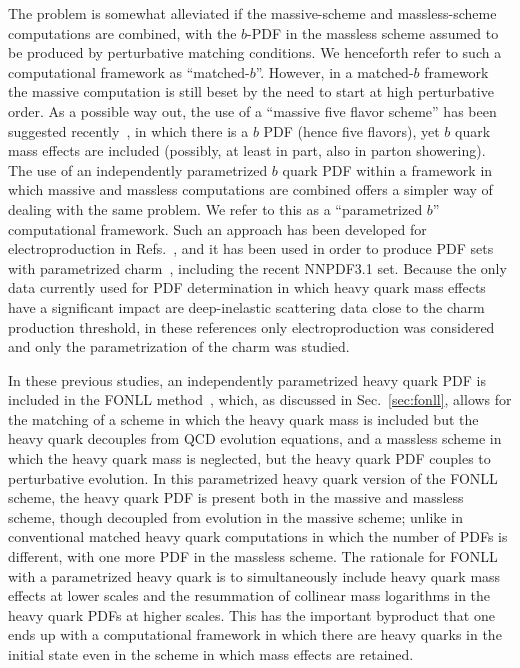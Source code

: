 The problem is somewhat
alleviated if the massive-scheme and massless-scheme
computations are combined, with the $b$-PDF in the massless scheme assumed to be
produced by perturbative matching conditions.  We  henceforth refer to
such a computational 
framework as ``matched-$b$''. However, in a matched-$b$ framework the
massive computation is still beset by the need to start at high
perturbative order.
As a possible way out, the use of a ``massive five flavor scheme'' has
been suggested recently~\cite{Krauss:2017wmx,Figueroa:2018chn}, in
which there is a $b$ PDF (hence five flavors), yet $b$ quark mass
effects are included (possibly, at least in part, also in parton showering).
The use of an independently parametrized $b$ quark PDF
within a framework in which massive and massless computations are
combined
offers a simpler way of dealing with the same
problem. We  refer to this as a ``parametrized $b$''
computational framework.
Such an approach has been developed for electroproduction in
Refs.~\cite{Ball:2015tna,Ball:2015dpa}, and it has been used in order
to produce PDF sets with parametrized
charm~\cite{Ball:2016neh,Ball:2017nwa}, including the recent NNPDF3.1
set. Because the only data currently used for PDF determination in which 
heavy quark mass effects have  a significant impact are deep-inelastic
scattering data close  to the charm production threshold, in these
references only electroproduction was considered and only the
parametrization of the charm was studied.

In these previous studies, an independently parametrized heavy quark PDF is
included in the FONLL  method~\cite{Cacciari:1998it},
which, as discussed in Sec.~\ref{sec:fonll}, allows for the
matching of a scheme in which the heavy quark mass is included but the
heavy quark decouples from QCD evolution equations, and a massless
scheme in which the heavy quark mass is neglected, but the heavy quark
PDF couples to perturbative evolution.
In this parametrized heavy quark version of the FONLL scheme, the heavy
quark PDF is present both in the massive and massless scheme, though
decoupled from evolution in the massive scheme; unlike in conventional
matched heavy quark computations
in which the number of PDFs is different, with one more
PDF in the massless scheme. The rationale for FONLL
with a parametrized heavy quark is to simultaneously include heavy quark
mass effects at lower scales and
the resummation of collinear mass logarithms in the heavy quark PDFs at
higher scales. This has the important byproduct that one
ends up with a computational framework in which there are heavy quarks in
the initial state even in the scheme in which mass effects are
retained.

